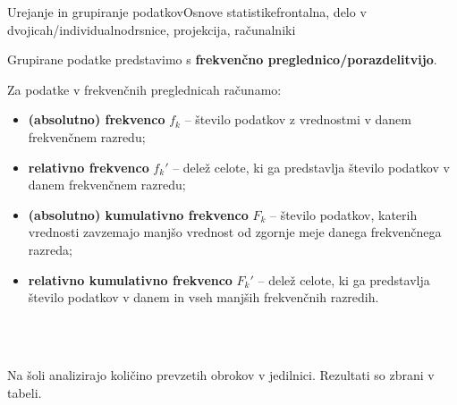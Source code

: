 \begin{priprava}{2}{}{Urejanje in grupiranje podatkov}{Osnove statistike}{frontalna, delo v dvojicah/individualno}{drsnice, projekcija, računalniki}
        
            
                Grupirane podatke predstavimo s \textbf{frekvenčno preglednico/porazdelitvijo}.
            

            
                Za podatke v frekvenčnih preglednicah računamo:
                \begin{itemize}
                    \item \textbf{(absolutno) frekvenco} $f_k$ -- število podatkov z vrednostmi v danem frekvenčnem razredu;
                    \item \textbf{relativno frekvenco} $f_k'$ -- delež celote, ki ga predstavlja število podatkov v danem frekvenčnem razredu;
                    \item \textbf{(absolutno) kumulativno frekvenco} $F_k$ -- število podatkov, katerih vrednosti zavzemajo manjšo vrednost od zgornje meje danega frekvenčnega razreda;
                    \item \textbf{relativno kumulativno frekvenco} $F_k'$ -- delež celote, ki ga predstavlja število podatkov v danem in vseh manjših frekvenčnih razredih.
                \end{itemize}
            
        
                ~\\~


        
        
                    \begin{naloga}
                        Na šoli analizirajo količino prevzetih obrokov v jedilnici. Rezultati so zbrani v tabeli. 
        

\end{naloga}
\end{priprava}
